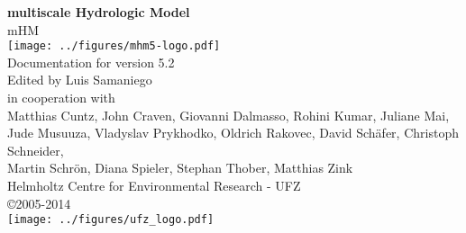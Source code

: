 \documentclass{book}
\begin{document}
\hypersetup{pageanchor=false,citecolor=blue}
\begin{titlepage}
\vspace*{2.0cm}
\begin{center}
{\Huge \bf multiscale Hydrologic Model}\\
\vspace*{1cm}
{\Huge mHM}\\
\vspace*{1cm}
\texttt{[image: ../figures/mhm5-logo.pdf]}\\
\vspace*{1.5cm}
{\Large Documentation for version 5.2}\\
\vspace*{2.5cm}
{\large Edited by Luis Samaniego}\\
\vspace*{0.5cm}
{\large in cooperation with}\\
\vspace*{0.5cm}
{\large 
Matthias Cuntz,
John Craven,
Giovanni Dalmasso,
Rohini Kumar,
Juliane Mai, \\
Jude Musuuza,
Vladyslav Prykhodko,
Oldrich Rakovec, 
David Sch\"{a}fer,
Christoph Schneider,\\
Martin Schr\"{o}n,
Diana Spieler,
Stephan Thober,
Matthias Zink }\\
\vspace*{2cm}
{\large Helmholtz Centre for Environmental Research - UFZ}\\
\vspace*{0.25cm}
{\large \copyright 2005-2014}\\
\vspace*{0.75cm}
\texttt{[image: ../figures/ufz\_logo.pdf]}\\

\end{center}
\end{titlepage}
\clearemptydoublepage
{}
\tableofcontents
\clearemptydoublepage
{}
\hypersetup{pageanchor=true,citecolor=blue}
\end{document}

